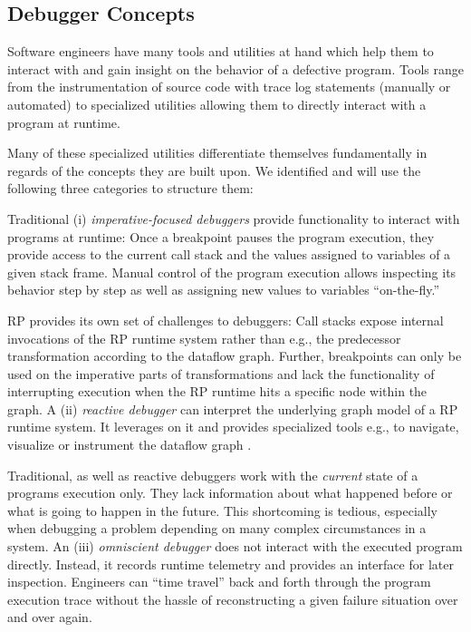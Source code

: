 \documentclass[sigplan,screen,review]{acmart}
\begin{document}
\subsection{Debugger Concepts}

Software engineers have many tools and utilities at hand which help them to interact with and gain insight on the behavior of a defective program. Tools range from the instrumentation of source code with trace log statements (manually or automated) to specialized utilities allowing them to directly interact with a program at runtime.

Many of these specialized utilities differentiate themselves fundamentally in regards of the concepts they are built upon. We identified and will use the following three categories to structure them:

Traditional (i) \emph{imperative-focused debuggers} provide functionality to interact with programs at runtime: Once a breakpoint pauses the program execution, they provide access to the current call stack and the values assigned to variables of a given stack frame. Manual control of the program execution allows inspecting its behavior step by step as well as assigning new values to variables ``on-the-fly.''

RP provides its own set of challenges to debuggers: Call stacks expose internal invocations of the RP runtime system rather than e.g., the predecessor transformation according to the dataflow graph. Further, breakpoints can only be used on the imperative parts of transformations and lack the functionality of interrupting execution when the RP runtime hits a specific node within the graph. A (ii) \emph{reactive debugger} can interpret the underlying graph model of a RP runtime system. It leverages on it and provides specialized tools e.g., to navigate, visualize or instrument the dataflow graph \cite{10.1145/2884781.2884815} \cite{10.1145/3180155.3180156} \cite{rxviz}.

Traditional, as well as reactive debuggers work with the \emph{current} state of a programs execution only. They lack information about what happened before or what is going to happen in the future. This shortcoming is tedious, especially when debugging a problem depending on many complex circumstances in a system. An (iii) \emph{omniscient debugger} \cite{5287015} \cite{DBLP:journals/corr/OCallahanJFHNP17} does not interact with the executed program directly. Instead, it records runtime telemetry and provides an interface for later inspection. Engineers can ``time travel'' back and forth through the program execution trace without the hassle of reconstructing a given failure situation over and over again.
\end{document}
